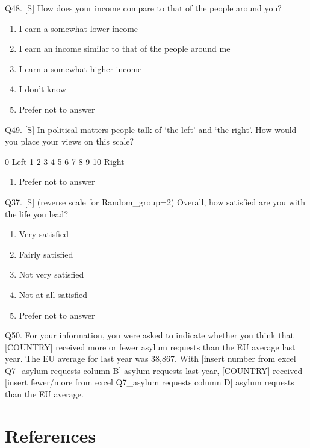 \documentclass[
  12pt,
  a4paper,
]{article}
\providecommand{\tightlist}{%
  \setlength{\itemsep}{0pt}\setlength{\parskip}{0pt}}
\begin{document}
Q48. {[}S{]} How does your income compare to that of the people around you?

\begin{enumerate}
\def\labelenumi{\arabic{enumi}.}
\tightlist
\item
  I earn a somewhat lower income
\item
  I earn an income similar to that of the people around me
\item
  I earn a somewhat higher income
\item
  I don't know
\item
  Prefer not to answer
\end{enumerate}

Q49. {[}S{]} In political matters people talk of `the left' and `the right'. How would you place your views on this scale?

0
Left 1 2 3 4 5 6 7 8 9 10
Right

\begin{enumerate}
\def\labelenumi{\arabic{enumi}.}
\setcounter{enumi}{98}
\tightlist
\item
  Prefer not to answer
\end{enumerate}

Q37. {[}S{]} (reverse scale for Random\_group=2) Overall, how satisfied are you with the life you lead?

\begin{enumerate}
\def\labelenumi{\arabic{enumi}.}
\tightlist
\item
  Very satisfied
\item
  Fairly satisfied
\item
  Not very satisfied
\item
  Not at all satisfied
\item
  Prefer not to answer
\end{enumerate}

Q50. For your information, you were asked to indicate whether you think that {[}COUNTRY{]} received more or fewer asylum requests than the EU average last year. The EU average for last year was 38,867. With {[}insert number from excel Q7\_asylum requests column B{]} asylum requests last year, {[}COUNTRY{]} received {[}insert fewer/more from excel Q7\_asylum requests column D{]} asylum requests than the EU average.

\section*{References}\label{references}
\end{document}
